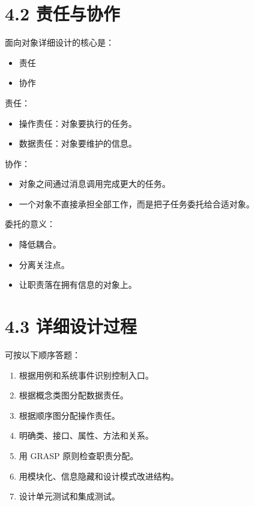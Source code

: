 \documentclass[UTF8,zihao=-4]{ctexart}
\begin{document}
\section{4.2 责任与协作}

面向对象详细设计的核心是：

\begin{itemize}
\item 责任
\item 协作
\end{itemize}

责任：

\begin{itemize}
\item 操作责任：对象要执行的任务。
\item 数据责任：对象要维护的信息。
\end{itemize}

协作：

\begin{itemize}
\item 对象之间通过消息调用完成更大的任务。
\item 一个对象不直接承担全部工作，而是把子任务委托给合适对象。
\end{itemize}

委托的意义：

\begin{itemize}
\item 降低耦合。
\item 分离关注点。
\item 让职责落在拥有信息的对象上。
\end{itemize}

\section{4.3 详细设计过程}

可按以下顺序答题：

\begin{enumerate}
\item 根据用例和系统事件识别控制入口。
\item 根据概念类图分配数据责任。
\item 根据顺序图分配操作责任。
\item 明确类、接口、属性、方法和关系。
\item 用 GRASP 原则检查职责分配。
\item 用模块化、信息隐藏和设计模式改进结构。
\item 设计单元测试和集成测试。
\end{enumerate}
\end{document}
